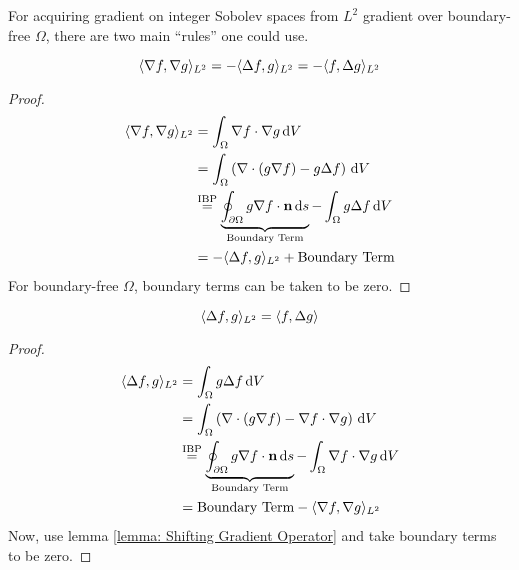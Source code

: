 \documentclass[../dissertation.tex]{subfiles}
\begin{document}
For acquiring gradient on integer Sobolev spaces from $L^2$ gradient over boundary-free $\Omega$,
there are two main ``rules'' one could use.

\begin{lemma}
    \label{lemma: Shifting Gradient Operator}
    \begin{equation}
        \langle \nabla f,\nabla g \rangle_{L^2} = -\langle \Delta f, g \rangle_{L^2} = -\langle f, \Delta g \rangle_{L^2}
    \end{equation}
    \begin{proof}
        \begin{align*}
            \langle \nabla f, \nabla g \rangle_{L^2} &= \int_{\Omega} \nabla f \cdot \nabla g \, \text{d} V \\
            &= \int_{\Omega} \left( \nabla \cdot \left( g \nabla f \right) - g \Delta f \right) \, \text{d} V \\
            &\stackrel{\text{IBP}}{=} \underbrace{\oint_{\partial \Omega} g \nabla f \cdot \mathbf{n} \, \text{d} s}_{\text{Boundary Term}} - \int_{\Omega} g \Delta f \, \text{d} V\\
            &= -\langle \Delta f, g \rangle_{L^2} + \text{Boundary Term}
        \end{align*}
        For boundary-free $\Omega$, boundary terms can be taken to be zero.
    \end{proof}
\end{lemma}

\begin{lemma}
    \begin{equation}
        \langle \Delta f, g \rangle_{L^2} = \langle f, \Delta g \rangle
    \end{equation}
    \begin{proof}
        \begin{align*}
            \langle \Delta f, g \rangle_{L^2} &= \int_{\Omega} g \Delta f \, \text{d} V \\
            &= \int_{\Omega} \left( \nabla \cdot \left( g \nabla f \right) - \nabla f \cdot \nabla g \right) \, \text{d} V \\
            &\stackrel{\text{IBP}}{=} \underbrace{\oint_{\partial \Omega} g \nabla f \cdot \mathbf{n} \, \text{d} s}_{\text{Boundary Term}} - \int_{\Omega} \nabla f \cdot \nabla g \, \text{d} V \\
            &= \text{Boundary Term} - \langle \nabla f, \nabla g \rangle_{L^2}
        \end{align*}
        Now, use lemma \ref{lemma: Shifting Gradient Operator} and take boundary terms to be zero.
    \end{proof}
\end{lemma}
\end{document}
